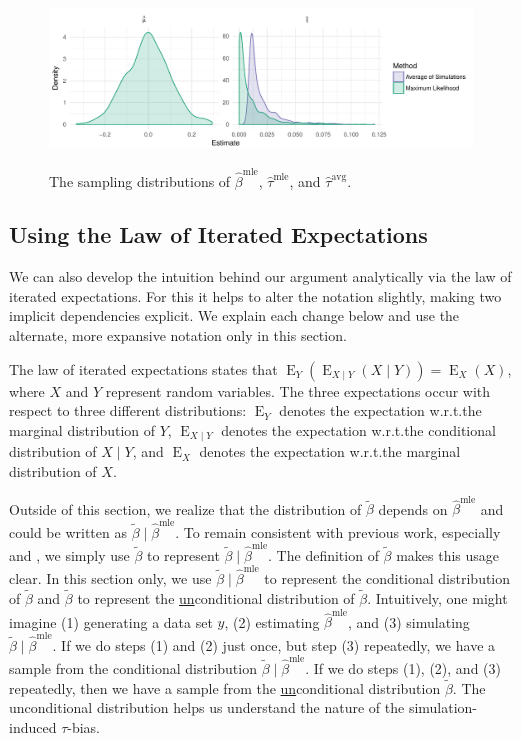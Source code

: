 \documentclass[11pt]{article}
\DeclareMathOperator*{\E}{\text{E}}
\begin{document}
\begin{figure}[h]
\begin{center}
\includegraphics[scale = 0.75]{figs/intuition-sampling.pdf}\\
\vspace{.1in}
\caption{The sampling distributions of $\hat{\beta}^\text{mle}$, $\hat{\tau}^\text{mle}$, and $\hat{\tau}^\text{avg}$.}\label{fig:int-samp}
\end{center}
\end{figure}

\subsection*{Using the Law of Iterated Expectations}

We can also develop the intuition behind our argument analytically via the law of iterated expectations.
For this it helps to alter the notation slightly, making two implicit dependencies explicit. We explain each change below and use the alternate, more expansive notation only in this section.

The law of iterated expectations states that $\E_Y \left( \E_{X \mid Y}(X \mid Y) \right) = \E_X(X)$, where $X$ and $Y$ represent random variables.
The three expectations occur with respect to three different distributions: $\E_Y$ denotes the expectation w.r.t.\@ the marginal distribution of $Y$, $\E_{X \mid Y}$ denotes the expectation w.r.t.\@ the conditional distribution of $X \mid Y$, and $\E_X$ denotes the expectation w.r.t.\@ the marginal distribution of $X$.

Outside of this section, we realize that the distribution of $\tilde{\beta}$ depends on $\hat{\beta}^\text{mle}$ and could be written as $\tilde{\beta} \mid \hat{\beta}^\text{mle}$.
To remain consistent with previous work, especially \cite{KingTomzWittenberg2000} and \cite{Herron1999}, we simply use $\tilde{\beta}$ to represent $\tilde{\beta} \mid \hat{\beta}^\text{mle}$.
The definition of $\tilde{\beta}$ makes this usage clear.
In this section only, we use $\tilde{\beta} \mid \hat{\beta}^\text{mle}$ to represent the conditional distribution of $\tilde{\beta}$ and $\tilde{\beta}$ to represent the \underline{un}conditional distribution of $\tilde{\beta}$.
Intuitively, one might imagine (1) generating a data set $y$, (2) estimating $\hat{\beta}^\text{mle}$, and (3) simulating $\tilde{\beta} \mid \hat{\beta}^\text{mle}$.
If we do steps (1) and (2) just once, but step (3) repeatedly, we have a sample from the conditional distribution $\tilde{\beta} \mid \hat{\beta}^\text{mle}$.
If we do steps (1), (2), and (3) repeatedly, then we have a sample from the \underline{un}conditional distribution $\tilde{\beta}$.
The unconditional distribution helps us understand the nature of the simulation-induced $\tau$-bias.
\end{document}

